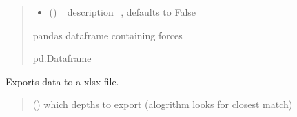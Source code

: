 \documentclass[letterpaper,10pt,english]{sphinxmanual}
\begin{document}
\begin{fulllineitems}
\begin{fulllineitems}
\begin{quote}
\begin{description}
\begin{itemize}
\item {} 
\sphinxAtStartPar
{} (\sphinxstyleliteralemphasis{\sphinxupquote{, }}) \textendash{} \_description\_, defaults to False

\end{itemize}

\sphinxAtStartPar
pandas dataframe containing forces

\sphinxAtStartPar
pd.Dataframe

\end{description}\end{quote}

\end{fulllineitems}


\begin{fulllineitems}
\label{\detokenize{tscw_module:tscw_module.tscw_DataClassesOutput.TSCW_TBHC.export_csv}}
\pysigstartsignatures
{}
\pysigstopsignatures
\sphinxAtStartPar
Exports data to a xlsx\sphinxhyphen{} file.
\begin{quote}\begin{description}
\sphinxAtStartPar
{} () \textendash{} which depths to export (alogrithm looks for closest match)

\end{description}\end{quote}

\end{fulllineitems}



\end{fulllineitems}
\end{document}
